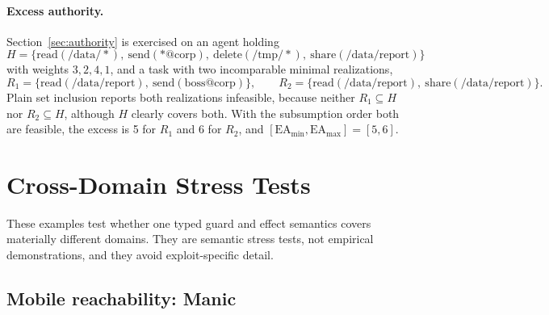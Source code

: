 \documentclass[11pt,letterpaper]{article}
\theoremstyle{definition}
\begin{document}
\paragraph{Excess authority.} Section~\ref{sec:authority} is exercised on an agent holding
\[H=\{\mathrm{read}(/\mathrm{data}/*),\ \mathrm{send}(*@\mathrm{corp}),\ \mathrm{delete}(/\mathrm{tmp}/*),\ \mathrm{share}(/\mathrm{data}/\mathrm{report})\}\]
with weights $3,2,4,1$, and a task with two incomparable minimal realizations,
\[R_1=\{\mathrm{read}(/\mathrm{data}/\mathrm{report}),\ \mathrm{send}(\mathrm{boss}@\mathrm{corp})\},\qquad R_2=\{\mathrm{read}(/\mathrm{data}/\mathrm{report}),\ \mathrm{share}(/\mathrm{data}/\mathrm{report})\}.\]
Plain set inclusion reports both realizations infeasible, because neither $R_1\subseteq H$ nor $R_2\subseteq H$, although $H$ clearly covers both. With the subsumption order both are feasible, the excess is 5 for $R_1$ and 6 for $R_2$, and $[\mathrm{EA}_{\min},\mathrm{EA}_{\max}]=[5,6]$.

\section{Cross-Domain Stress Tests}\label{sec:stress}

These examples test whether one typed guard and effect semantics covers materially different domains. They are semantic stress tests, not empirical demonstrations, and they avoid exploit-specific detail.

\subsection{Mobile reachability: Manic}\label{sec:manic}
\end{document}
